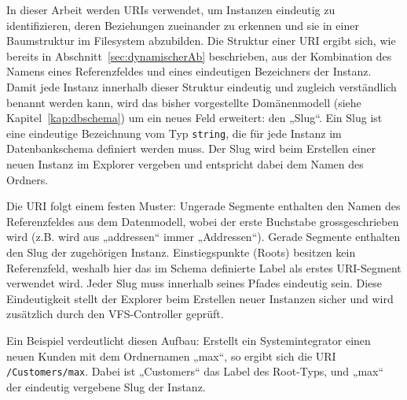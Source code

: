 In dieser Arbeit werden URIs verwendet, um Instanzen eindeutig zu identifizieren, deren Beziehungen zueinander zu erkennen und sie in einer Baumstruktur im Filesystem abzubilden. Die Struktur einer URI ergibt sich, wie bereits in Abschnitt~\ref{sec:dynamischerAb} beschrieben, aus der Kombination des Namens eines Referenzfeldes und eines eindeutigen Bezeichners der Instanz. Damit jede Instanz innerhalb dieser Struktur eindeutig und zugleich verständlich benannt werden kann, wird das bisher vorgestellte Domänenmodell (siehe Kapitel~\ref{kap:dbschema}) um ein neues Feld erweitert: den „Slug“. Ein Slug ist eine eindeutige Bezeichnung vom Typ \texttt{string}, die für jede Instanz im Datenbankschema definiert werden muss. Der Slug wird beim Erstellen einer neuen Instanz im Explorer vergeben und entspricht dabei dem Namen des Ordners.

Die URI folgt einem festen Muster: Ungerade Segmente enthalten den Namen des Referenzfeldes aus dem Datenmodell, wobei der erste Buchstabe grossgeschrieben wird (z.B. wird aus „addressen“ immer „Addressen“). Gerade Segmente enthalten den Slug der zugehörigen Instanz. Einstiegspunkte (Roots) besitzen kein Referenzfeld, weshalb hier das im Schema definierte Label als erstes URI-Segment verwendet wird. Jeder Slug muss innerhalb seines Pfades eindeutig sein. Diese Eindeutigkeit stellt der Explorer beim Erstellen neuer Instanzen sicher und wird zusätzlich durch den VFS-Controller geprüft.

Ein Beispiel verdeutlicht diesen Aufbau: Erstellt ein Systemintegrator einen neuen Kunden mit dem Ordnernamen „max“, so ergibt sich die URI \texttt{/Customers/max}. Dabei ist „Customers“ das Label des Root-Typs, und „max“ der eindeutig vergebene Slug der Instanz.





